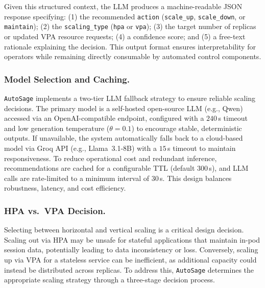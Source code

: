 \documentclass[sigconf]{acmart}
\newcommand{\Solution}{\texttt{AutoSage}}
\begin{document}
Given this structured context, the LLM produces a machine-readable JSON response specifying: (1) the recommended \texttt{action} (\texttt{scale\_up}, \texttt{scale\_down}, or \texttt{maintain}); (2) the \texttt{scaling\_type} (\texttt{hpa} or \texttt{vpa}); (3) the target number of replicas or updated VPA resource requests; (4) a confidence score; and (5) a free-text rationale explaining the decision. This output format ensures interpretability for operators while remaining directly consumable by automated control components.

\subsubsection{Model Selection and Caching.}

\Solution{} implements a two-tier LLM fallback strategy to ensure reliable scaling decisions. The primary model is a self-hosted open-source LLM (e.g., Qwen) accessed via an OpenAI-compatible endpoint, configured with a $240$\,s timeout and low generation temperature ($\theta = 0.1$) to encourage stable, deterministic outputs. If unavailable, the system automatically falls back to a cloud-based model via Groq API (e.g., Llama~3.1-8B) with a $15$\,s timeout to maintain responsiveness.
%
To reduce operational cost and redundant inference, recommendations are cached for a configurable TTL (default $300$\,s), and LLM calls are rate-limited to a minimum interval of $30$\,s. This design balances robustness, latency, and cost efficiency.

\subsubsection{HPA vs.\ VPA Decision.}\label{sec:hpa-vpa}
Selecting between horizontal and vertical scaling is a critical design decision. Scaling out via HPA may be unsafe for stateful applications that maintain in-pod session data, potentially leading to data inconsistency or loss. Conversely, scaling up via VPA for a stateless service can be inefficient, as additional capacity could instead be distributed across replicas.
To address this, \Solution{} determines the appropriate scaling strategy through a three-stage decision process.
\end{document}
